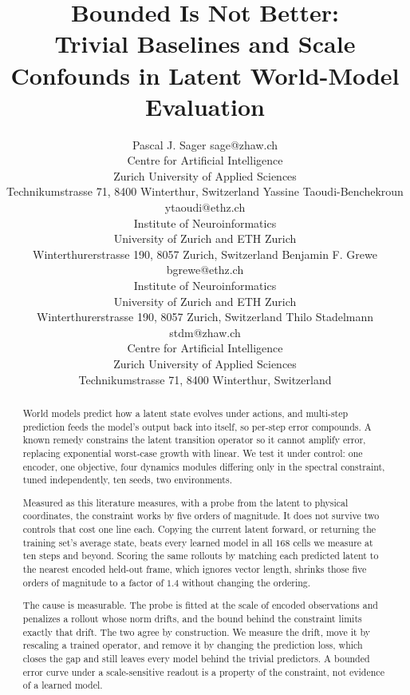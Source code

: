\documentclass[10pt]{article} %
\title{Bounded Is Not Better:\\ Trivial Baselines and Scale Confounds in Latent World-Model Evaluation}
\author{\name Pascal J. Sager \email sage@zhaw.ch \\
      \addr Centre for Artificial Intelligence\\
      Zurich University of Applied Sciences\\
      Technikumstrasse 71, 8400 Winterthur, Switzerland
      \AND
      \name Yassine Taoudi-Benchekroun \email ytaoudi@ethz.ch \\
      \addr Institute of Neuroinformatics\\
      University of Zurich and ETH Zurich\\
      Winterthurerstrasse 190, 8057 Zurich, Switzerland
      \AND
      \name Benjamin F. Grewe \email bgrewe@ethz.ch \\
      \addr Institute of Neuroinformatics\\
      University of Zurich and ETH Zurich\\
      Winterthurerstrasse 190, 8057 Zurich, Switzerland
      \AND
      \name Thilo Stadelmann \email stdm@zhaw.ch \\
      \addr Centre for Artificial Intelligence\\
      Zurich University of Applied Sciences\\
      Technikumstrasse 71, 8400 Winterthur, Switzerland}
\begin{document}
\maketitle

\begin{abstract}
World models predict how a latent state evolves under actions, and multi-step prediction feeds the model's output back into itself, so per-step error compounds. A known remedy constrains the latent transition operator so it cannot amplify error, replacing exponential worst-case growth with linear. We test it under control: one encoder, one objective, four dynamics modules differing only in the spectral constraint, tuned independently, ten seeds, two environments.

Measured as this literature measures, with a probe from the latent to physical coordinates, the constraint works by five orders of magnitude. It does not survive two controls that cost one line each. Copying the current latent forward, or returning the training set's average state, beats every learned model in all $168$ cells we measure at ten steps and beyond. Scoring the same rollouts by matching each predicted latent to the nearest encoded held-out frame, which ignores vector length, shrinks those five orders of magnitude to a factor of $1.4$ without changing the ordering.

The cause is measurable. The probe is fitted at the scale of encoded observations and penalizes a rollout whose norm drifts, and the bound behind the constraint limits exactly that drift. The two agree by construction. We measure the drift, move it by rescaling a trained operator, and remove it by changing the prediction loss, which closes the gap and still leaves every model behind the trivial predictors. A bounded error curve under a scale-sensitive readout is a property of the constraint, not evidence of a learned model.
\end{abstract}
\end{document}
